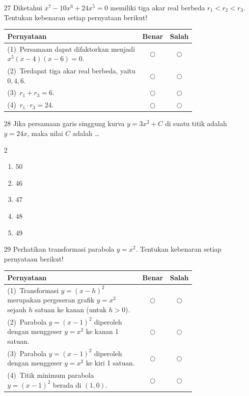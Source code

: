 \documentclass[11pt]{article}
\newenvironment{pilB}{%
  \par\smallskip\begin{multicols}{2}
  \begin{enumerate}[label=(\Alph*),leftmargin=*,itemsep=1pt,topsep=3pt]}%
  {\end{enumerate}\end{multicols}}
\begin{document}
\begin{soal}{27}
Diketahui $x^7-10x^6+24x^5=0$ memiliki tiga akar real berbeda
$r_1<r_2<r_3$.
Tentukan kebenaran setiap pernyataan berikut!

\par\smallskip
{\renewcommand{\arraystretch}{1.4}%
\begin{tabular}{@{}p{0.76\linewidth}cc@{}}
\hline
\textbf{Pernyataan} & \textbf{Benar} & \textbf{Salah}\\
\hline
(1)~Persamaan dapat difaktorkan menjadi $x^5(x-4)(x-6)=0$.
  & $\bigcirc$ & $\bigcirc$\\
(2)~Terdapat tiga akar real berbeda, yaitu $0,4,6$.
  & $\bigcirc$ & $\bigcirc$\\
(3)~$r_1+r_3 = 6$.
  & $\bigcirc$ & $\bigcirc$\\
(4)~$r_1\cdot r_3 = 24$.
  & $\bigcirc$ & $\bigcirc$\\
\hline
\end{tabular}}
\end{soal}

\begin{soal}{28}
Jika persamaan garis singgung kurva $y=3x^2+C$ di suatu titik
adalah $y=24x$, maka nilai $C$ adalah \ldots
\begin{pilB}
  \item $50$ \item $46$ \item $47$ \item $48$ \item $49$
\end{pilB}
\end{soal}

\begin{soal}{29}
Perhatikan transformasi parabola $y=x^2$.
Tentukan kebenaran setiap pernyataan berikut!

\par\smallskip
{\renewcommand{\arraystretch}{1.4}%
\begin{tabular}{@{}p{0.76\linewidth}cc@{}}
\hline
\textbf{Pernyataan} & \textbf{Benar} & \textbf{Salah}\\
\hline
(1)~Transformasi $y=(x-h)^2$ merupakan pergeseran grafik $y=x^2$
    sejauh $h$ satuan ke kanan (untuk $h>0$).
  & $\bigcirc$ & $\bigcirc$\\
(2)~Parabola $y=(x-1)^2$ diperoleh dengan menggeser $y=x^2$
    ke kanan 1 satuan.
  & $\bigcirc$ & $\bigcirc$\\
(3)~Parabola $y=(x-1)^2$ diperoleh dengan menggeser $y=x^2$
    ke kiri 1 satuan.
  & $\bigcirc$ & $\bigcirc$\\
(4)~Titik minimum parabola $y=(x-1)^2$ berada di $(1,0)$.
  & $\bigcirc$ & $\bigcirc$\\
\hline
\end{tabular}}
\end{soal}
\end{document}

